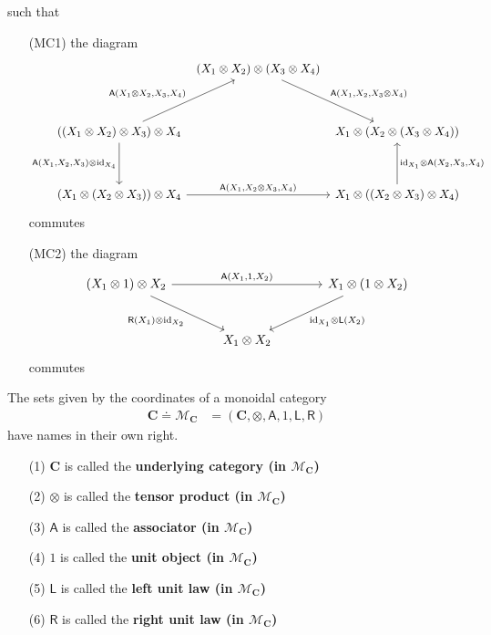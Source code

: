 such that
\begin{enumerate}
\item[(MC1)]
the diagram
\[
\begin{tikzcd}[row sep=3.5em,column sep=0.4em]
  &
  (X_{1} \otimes X_{2})
  \otimes
  (X_{3} \otimes X_{4})
  \arrow{dr}{\mathsf{A}(X_{1},X_{2},X_{3} \otimes X_{4})}
  &
  \\
  \left(
    (X_{1} \otimes X_{2})
    \otimes
    X_{3}
  \right)
  \otimes
  X_{4}
  \arrow{ur}{\mathsf{A}(X_{1} \otimes X_{2},X_{3},X_{4})}
  \arrow[swap]{d}{\mathsf{A}(X_{1},X_{2},X_{3}) \otimes \mathrm{id}_{X_{4}}}
  &
  &
  X_{1}
  \otimes
  \left(
    X_{2}
    \otimes
    (X_{3} \otimes X_{4})
  \right)
  \\
  \left(
    X_{1}
    \otimes
    (X_{2} \otimes X_{3})
  \right)
  \otimes
  X_{4}
  \arrow{rr}{\mathsf{A}(X_{1},X_{2} \otimes X_{3},X_{4})}
  &
  &
  X_{1}
  \otimes
  \left(
    (X_{2} \otimes X_{3})
    \otimes
    X_{4}
  \right)
  \arrow[swap]{u}{\mathrm{id}_{X_{1}} \otimes \mathsf{A}(X_{2},X_{3},X_{4})}
\end{tikzcd}
\]
commutes
\item[(MC2)]
the diagram
\[
\begin{tikzcd}[sep=large]
  (X_{1} \otimes 1)
  \otimes
  X_{2}
  \arrow{rr}{\mathsf{A}(X_{1},1,X_{2})}
  \arrow[swap]{dr}{\mathsf{R}(X_{1}) \otimes \mathrm{id}_{X_{2}}}
  &
  &
  X_{1}
  \otimes
  (1 \otimes X_{2})
  \arrow{dl}{\mathrm{id}_{X_{1}} \otimes \mathsf{L}(X_{2})}
  \\
  &
  X_{1}
  \otimes
  X_{2}
  &
\end{tikzcd}
\]
commutes
\end{enumerate}
The sets given by the coordinates of a monoidal category
\begin{align*}
  \mathbf{C}
  \doteq
  \mathcal{M}_{\mathbf{C}}
  &=
  \left(
    \mathbf{C},
    \otimes,
    \mathsf{A},
    1,
    \mathsf{L},
    \mathsf{R}
  \right)
\end{align*}
have names in their own right.
\begin{enumerate}
\item[(1)]
$\mathbf{C}$ is called the \textbf{underlying category (in $\mathcal{M}_{\mathbf{C}}$)}
\item[(2)]
$\otimes$ is called the \textbf{tensor product (in $\mathcal{M}_{\mathbf{C}}$)}
\item[(3)]
$\mathsf{A}$ is called the \textbf{associator (in $\mathcal{M}_{\mathbf{C}}$)}
\item[(4)]
$1$ is called the \textbf{unit object (in $\mathcal{M}_{\mathbf{C}}$)}
\item[(5)]
$\mathsf{L}$ is called the \textbf{left unit law (in $\mathcal{M}_{\mathbf{C}}$)}
\item[(6)]
$\mathsf{R}$ is called the \textbf{right unit law (in $\mathcal{M}_{\mathbf{C}}$)}
\end{enumerate}
